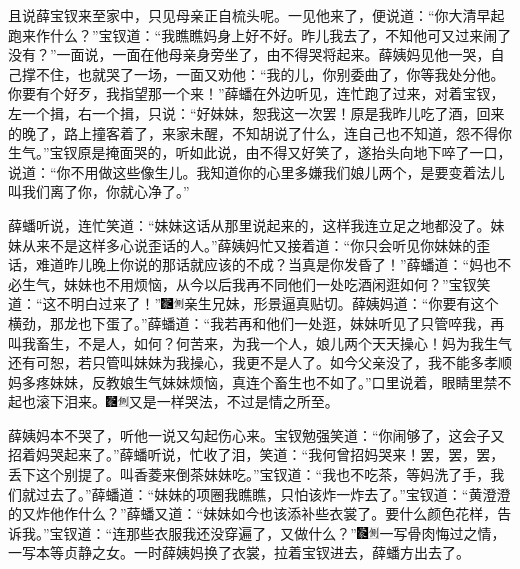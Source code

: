 且说薛宝钗来至家中，只见母亲正自梳头呢。一见他来了，便说道：``你大清早起跑来作什么？''宝钗道：``我瞧瞧妈身上好不好。昨儿我去了，不知他可又过来闹了没有？''一面说，一面在他母亲身旁坐了，由不得哭将起来。薛姨妈见他一哭，自己撑不住，也就哭了一场，一面又劝他：``我的儿，你别委曲了，你等我处分他。你要有个好歹，我指望那一个来！''薛蟠在外边听见，连忙跑了过来，对着宝钗，左一个揖，右一个揖，只说：``好妹妹，恕我这一次罢！原是我昨儿吃了酒，回来的晚了，路上撞客着了，来家未醒，不知胡说了什么，连自己也不知道，怨不得你生气。''宝钗原是掩面哭的，听如此说，由不得又好笑了，遂抬头向地下啐了一口，说道：``你不用做这些像生儿。我知道你的心里多嫌我们娘儿两个，是要变着法儿叫我们离了你，你就心净了。''

薛蟠听说，连忙笑道：``妹妹这话从那里说起来的，这样我连立足之地都没了。妹妹从来不是这样多心说歪话的人。''薛姨妈忙又接着道：``你只会听见你妹妹的歪话，难道昨儿晚上你说的那话就应该的不成？当真是你发昏了！''薛蟠道：``妈也不必生气，妹妹也不用烦恼，从今以后我再不同他们一处吃酒闲逛如何？''宝钗笑道：``这不明白过来了！''{\includegraphics[width=3mm]{../Images/00006}\includegraphics[width=3mm]{../Images/00011}\footnotesize \kaishu 亲生兄妹，形景逼真贴切。}薛姨妈道：``你要有这个横劲，那龙也下蛋了。''薛蟠道：``我若再和他们一处逛，妹妹听见了只管啐我，再叫我畜生，不是人，如何？何苦来，为我一个人，娘儿两个天天操心！妈为我生气还有可恕，若只管叫妹妹为我操心，我更不是人了。如今父亲没了，我不能多孝顺妈多疼妹妹，反教娘生气妹妹烦恼，真连个畜生也不如了。''口里说着，眼睛里禁不起也滚下泪来。{\includegraphics[width=3mm]{../Images/00006}\includegraphics[width=3mm]{../Images/00011}\footnotesize \kaishu 又是一样哭法，不过是情之所至。}

薛姨妈本不哭了，听他一说又勾起伤心来。宝钗勉强笑道：``你闹够了，这会子又招着妈哭起来了。''薛蟠听说，忙收了泪，笑道：``我何曾招妈哭来！罢，罢，罢，丢下这个别提了。叫香菱来倒茶妹妹吃。''宝钗道：``我也不吃茶，等妈洗了手，我们就过去了。''薛蟠道：``妹妹的项圈我瞧瞧，只怕该炸一炸去了。''宝钗道：``黄澄澄的又炸他作什么？''薛蟠又道：``妹妹如今也该添补些衣裳了。要什么颜色花样，告诉我。''宝钗道：``连那些衣服我还没穿遍了，又做什么？''{\includegraphics[width=3mm]{../Images/00006}\includegraphics[width=3mm]{../Images/00011}\footnotesize \kaishu 一写骨肉悔过之情，一写本等贞静之女。}一时薛姨妈换了衣裳，拉着宝钗进去，薛蟠方出去了。


